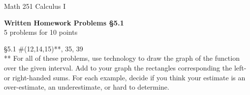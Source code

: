 \documentclass[11pt]{report}
\theoremstyle{plain}
\begin{document}
\hfill Math 251 Calculus I
\begin{center}
\Large{\textbf{Written Homework Problems \S 5.1}} \\
5 problems for 10 points\\
\end{center}

\begin{description}
\item{\S 5.1} \#(12,14,15)**, 35, 39\\

** For all of these problems, use technology to draw the graph of the function over the given interval. Add to your graph the rectangles corresponding the left- or right-handed sums. For each example, decide if you think your estimate is an over-estimate, an underestimate, or hard to determine.
\end{description}
\end{document}
